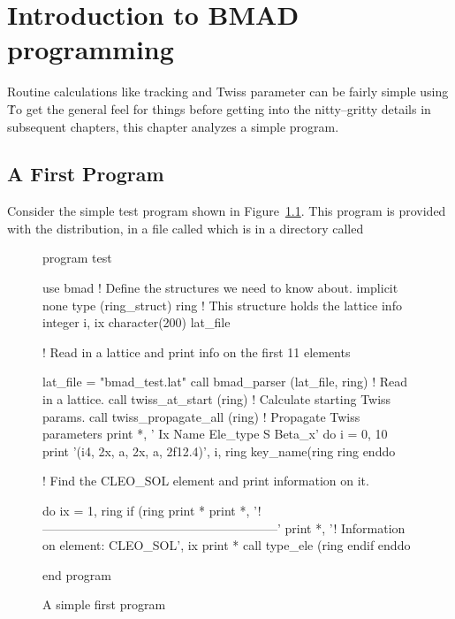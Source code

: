\chapter{Introduction to BMAD programming}
\label{c:program_info}

Routine calculations like tracking and Twiss parameter can be fairly
simple using \bmad\. To get the general feel for things before
getting into the nitty--gritty details in subsequent chapters, this
chapter analyzes a simple program.

\section{A First Program}

Consider the simple test program shown in Figure~\ref{f:program}.
This program is provided with the \bmad distribution, in a file called
 which is in a directory called 

\begin{figure}
\begin{listing}{1}
program test

  use bmad                 ! Define the structures we need to know about.
  implicit none
  type (ring_struct) ring  ! This structure holds the lattice info
  integer i, ix
  character(200) lat_file

! Read in a lattice and print info on the first 11 elements

  lat_file = "bmad_test.lat"
  call bmad_parser (lat_file, ring)    ! Read in a lattice.
  call twiss_at_start (ring)           ! Calculate starting Twiss params.
  call twiss_propagate_all (ring)      ! Propagate Twiss parameters
  print *, ' Ix  Name              Ele_type                   S      Beta_x'
  do i = 0, 10
    print '(i4, 2x, a, 2x, a, 2f12.4)', i, ring%
                    key_name(ring%
                    ring%
  enddo

! Find the CLEO_SOL element and print information on it.

  do ix = 1, ring%
    if (ring%
      print *
      print *, '!---------------------------------------------------------'
      print *, '! Information on element: CLEO_SOL', ix
      print *
      call type_ele (ring%
    endif
  enddo

end program
\end{listing}
\caption{A simple first program}
\label{f:program}
\end{figure}

